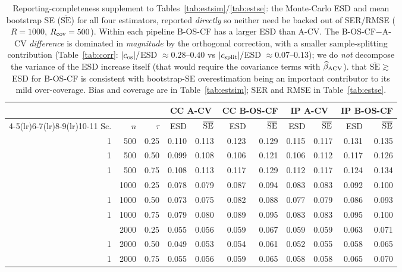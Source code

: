 \begin{table}[t]\centering\small
\caption{Reporting-completeness supplement to Tables~\ref{tab:estsim}/\ref{tab:estse}: the Monte-Carlo ESD and mean bootstrap SE ($\overline{\mathrm{SE}}$) for all four estimators, reported \emph{directly} so neither need be backed out of SER/RMSE ($R=1000$, $R_{\rm cov}=500$). Within each pipeline B-OS-CF has a larger ESD than A-CV. The B-OS-CF$-$A-CV \emph{difference} is dominated in \emph{magnitude} by the orthogonal correction, with a smaller sample-splitting contribution (Table~\ref{tab:corr}: $|c_{\rm os}|/$ESD $\approx0.28$--$0.40$ vs $|c_{\rm split}|/$ESD $\approx0.07$--$0.13$); we do \emph{not} decompose the variance of the ESD increase itself (that would require the covariance terms with $\widehat\beta_{\rm ACV}$). that $\overline{\mathrm{SE}}\gtrsim$ESD for B-OS-CF is consistent with bootstrap-SE overestimation being an important contributor to its mild over-coverage. Bias and coverage are in Table~\ref{tab:estsim}; SER and RMSE in Table~\ref{tab:estse}.}
\label{tab:estfull}\begin{tabular}{rrr rr rr rr rr}\toprule
&&&\multicolumn{2}{c}{CC A-CV}&\multicolumn{2}{c}{CC B-OS-CF}&\multicolumn{2}{c}{IP A-CV}&\multicolumn{2}{c}{IP B-OS-CF}\\
\cmidrule(lr){4-5}\cmidrule(lr){6-7}\cmidrule(lr){8-9}\cmidrule(lr){10-11}
Sc.&$n$&$\tau$&ESD&$\overline{\rm SE}$&ESD&$\overline{\rm SE}$&ESD&$\overline{\rm SE}$&ESD&$\overline{\rm SE}$\\\midrule
1 & 500 & 0.25 & 0.110 & 0.113 & 0.123 & 0.129 & 0.115 & 0.117 & 0.131 & 0.135 \\
1 & 500 & 0.50 & 0.099 & 0.108 & 0.106 & 0.121 & 0.106 & 0.112 & 0.117 & 0.126 \\
1 & 500 & 0.75 & 0.108 & 0.113 & 0.117 & 0.129 & 0.112 & 0.117 & 0.124 & 0.134 \\
\addlinespace
1 & 1000 & 0.25 & 0.078 & 0.079 & 0.087 & 0.094 & 0.083 & 0.083 & 0.092 & 0.100 \\
1 & 1000 & 0.50 & 0.073 & 0.075 & 0.082 & 0.088 & 0.077 & 0.079 & 0.086 & 0.093 \\
1 & 1000 & 0.75 & 0.079 & 0.080 & 0.089 & 0.095 & 0.083 & 0.083 & 0.095 & 0.100 \\
\addlinespace
1 & 2000 & 0.25 & 0.055 & 0.056 & 0.059 & 0.067 & 0.059 & 0.059 & 0.063 & 0.071 \\
1 & 2000 & 0.50 & 0.049 & 0.053 & 0.054 & 0.061 & 0.052 & 0.055 & 0.058 & 0.065 \\
1 & 2000 & 0.75 & 0.055 & 0.056 & 0.059 & 0.065 & 0.058 & 0.058 & 0.065 & 0.070 \\

\end{tabular}
\end{table}
